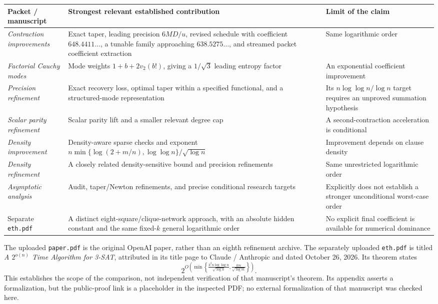 \documentclass[11pt,letterpaper]{article}
\numberwithin{equation}{section}
\theoremstyle{definition}\newtheorem{definition}[theorem]{Definition}
\theoremstyle{remark}\newtheorem{remark}[theorem]{Remark}
\begin{document}
\begin{longtable}{@{}>{\raggedright\arraybackslash}p{.25\linewidth}>{\raggedright\arraybackslash}p{.43\linewidth}>{\raggedright\arraybackslash}p{.24\linewidth}@{}}
\toprule
Packet / manuscript & Strongest relevant established contribution & Limit of the claim\\
\midrule
\endhead
\emph{Contraction improvements} \cite{contractionpacket}
& Exact taper, leading precision $6MD/u$, revised schedule with coefficient
$648.4411\ldots$, a tunable family approaching $638.5275\ldots$, and
streamed packet coefficient extraction
& Same logarithmic order\\
\emph{Factorial Cauchy modes} \cite{cauchypacket}
& Mode weights $1+b+2v_2(b!)$, giving a $1/\sqrt3$ leading entropy factor
& An exponential coefficient improvement\\
\emph{Precision refinement} \cite{precisionpacket}
& Exact recovery loss, optimal taper within a specified functional, and
a structured-mode representation
& Its $n\log\log n/\log n$ target requires an unproved summation hypothesis\\
\emph{Scalar parity refinement} \cite{scalarpacket}
& Scalar parity lift and a smaller relevant degree cap
& A second-contraction acceleration is conditional\\
\emph{Density improvement} \cite{densitypacket}
& Density-aware sparse checks and exponent
$n\min\{\log(2+m/n),\log\log n\}/\sqrt{\log n}$
& Improvement depends on clause density\\
\emph{Density refinement} \cite{densitypacket2}
& A closely related density-sensitive bound and precision refinements
& Same unrestricted logarithmic order\\
\emph{Asymptotic analysis} \cite{asymptoticpacket}
& Audit, taper/Newton refinements, and precise conditional research targets
& Explicitly does not establish a stronger unconditional worst-case order\\
Separate \texttt{eth.pdf} \cite{alternate}
& A distinct eight-square/clique-network approach, with an absolute hidden
constant and the same fixed-$k$ general logarithmic order
& No explicit final coefficient is available for numerical dominance\\
\bottomrule
\end{longtable}

The uploaded \texttt{paper.pdf} is the original OpenAI paper, rather than
an eighth refinement archive. The separately uploaded \texttt{eth.pdf}
is titled \emph{A $2^{o(n)}$ Time Algorithm for 3-SAT}, attributed in its
title page to Claude / Anthropic and dated October 26, 2026.
Its theorem states
\[
 2^{O\left(\min\left\{
 \frac{k^2n\log\log n}{\sqrt{\log n}},
 \frac{km}{\sqrt{\log m}}
 \right\}\right)}.
\]
This establishes the scope of the comparison, not independent verification
of that manuscript's theorem. Its appendix asserts a formalization, but
the public-proof link is a placeholder in the inspected PDF; no external
formalization of that manuscript was checked here.
\end{document}
